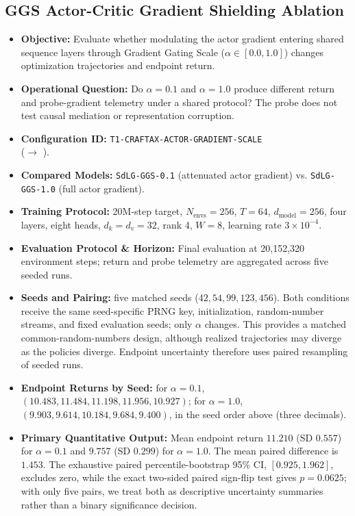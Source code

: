 \subsection{GGS Actor-Critic Gradient Shielding Ablation}
\begin{itemize}
    \item \textbf{Objective:} Evaluate whether modulating the actor gradient entering shared sequence layers through Gradient Gating Scale ($\alpha \in [0.0, 1.0]$) changes optimization trajectories and endpoint return.
    \item \textbf{Operational Question:} Do $\alpha=0.1$ and $\alpha=1.0$ produce different return and probe-gradient telemetry under a shared protocol? The probe does not test causal mediation or representation corruption.
    \item \textbf{Configuration ID:} \texttt{T1-CRAFTAX-ACTOR-GRADIENT-SCALE} \\ ($\to$ ).
    \item \textbf{Compared Models:} \texttt{SdLG-GGS-0.1} (attenuated actor gradient) vs. \texttt{SdLG-GGS-1.0} (full actor gradient).
    \item \textbf{Training Protocol:} 20M-step target, $N_{\text{envs}}=256$, $T=64$, $d_{\text{model}}=256$, four layers, eight heads, $d_k=d_v=32$, rank 4, $W=8$, learning rate $3\times 10^{-4}$.
    \item \textbf{Evaluation Protocol \& Horizon:} Final evaluation at 20,152,320 environment steps; return and probe telemetry are aggregated across five seeded runs.
    \item \textbf{Seeds and Pairing:} five matched seeds ($42,54,99,123,456$). Both conditions receive the same seed-specific PRNG key, initialization, random-number streams, and fixed evaluation seeds; only $\alpha$ changes. This provides a matched common-random-numbers design, although realized trajectories may diverge as the policies diverge. Endpoint uncertainty therefore uses paired resampling of seeded runs.
    \item \textbf{Endpoint Returns by Seed:} for $\alpha=0.1$, $(10.483,11.484,11.198,11.956,10.927)$; for $\alpha=1.0$, $(9.903,9.614,10.184,9.684,9.400)$, in the seed order above (three decimals).
    \item \textbf{Primary Quantitative Output:} Mean endpoint return $11.210$ (SD $0.557$) for $\alpha=0.1$ and $9.757$ (SD $0.299$) for $\alpha=1.0$. The mean paired difference is $1.453$. The exhaustive paired percentile-bootstrap 95\% CI, $[0.925,1.962]$, excludes zero, while the exact two-sided paired sign-flip test gives $p=0.0625$; with only five pairs, we treat both as descriptive uncertainty summaries rather than a binary significance decision.

\end{itemize}
